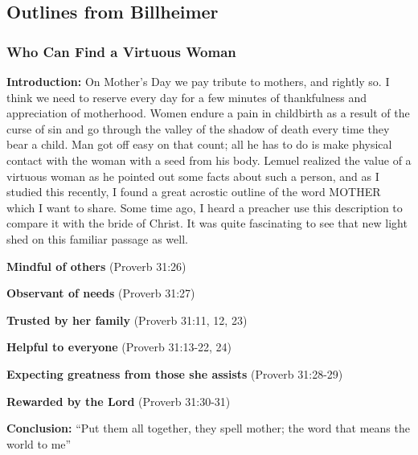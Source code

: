 \subsection{Outlines from Billheimer}

\subsubsection{Who Can Find a Virtuous Woman}


\textbf{Introduction: }On Mother’s Day we pay tribute to mothers, and rightly so. I think we need to reserve every day for a few minutes of thankfulness and appreciation of motherhood. Women endure a pain in childbirth as a result of the curse of sin and go through the valley of the shadow of death every time they bear a child. Man got off easy on that count; all he has to do is make physical contact with the woman with a seed from his body. Lemuel realized the value of a virtuous woman as he pointed out some facts about such a person, and as I studied this recently, I found a great acrostic outline of the word MOTHER which I want to share. Some time ago, I heard a preacher use this description to compare it with the bride of Christ. It was quite fascinating to see that new light shed on this familiar passage as well.
\begin{compactenum}[I.]
    \item \textbf{Mindful of others}  (Proverb 31:26)
    \item \textbf{Observant of needs}  (Proverb 31:27)
    \item \textbf{Trusted by her family}  (Proverb 31:11, 12, 23)
    \item \textbf{Helpful to everyone}  (Proverb 31:13-22, 24)
    \item \textbf{Expecting greatness from those she assists}  (Proverb 31:28-29)
    \item \textbf{Rewarded by the Lord}  (Proverb 31:30-31)
\end{compactenum}
\textbf{Conclusion: }``Put them all together, they spell mother; the word that means the world to me''

